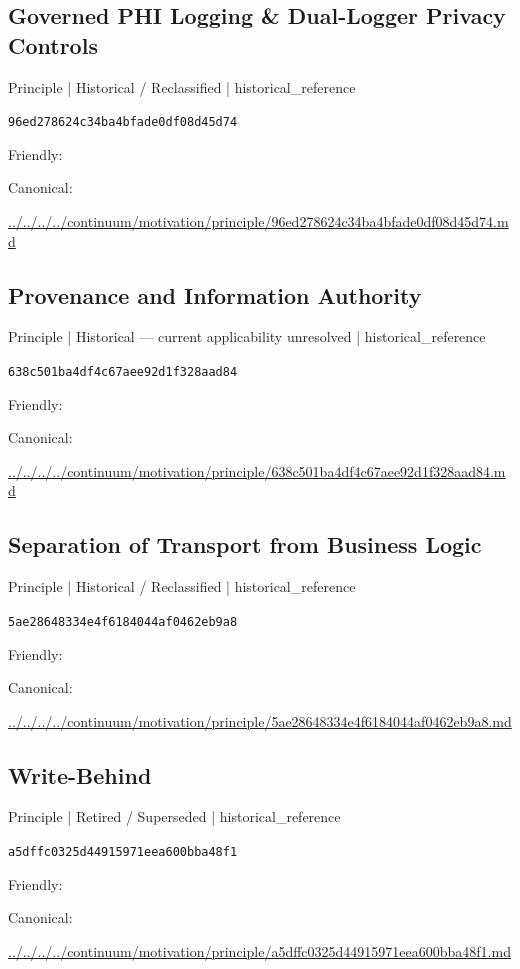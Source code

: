 \documentclass[10pt,a4paper]{article}
\begin{document}
\subsection*{Governed PHI Logging \& Dual-Logger Privacy Controls}
{\small Principle | Historical / Reclassified | historical\_reference}\par
\texttt{96ed278624c34ba4bfade0df08d45d74}\par
Friendly: \par
Canonical: \par
{\footnotesize\url{../../../../continuum/motivation/principle/96ed278624c34ba4bfade0df08d45d74.md}}\par
\subsection*{Provenance and Information Authority}
{\small Principle | Historical — current applicability unresolved | historical\_reference}\par
\texttt{638c501ba4df4c67aee92d1f328aad84}\par
Friendly: \par
Canonical: \par
{\footnotesize\url{../../../../continuum/motivation/principle/638c501ba4df4c67aee92d1f328aad84.md}}\par
\subsection*{Separation of Transport from Business Logic}
{\small Principle | Historical / Reclassified | historical\_reference}\par
\texttt{5ae28648334e4f6184044af0462eb9a8}\par
Friendly: \par
Canonical: \par
{\footnotesize\url{../../../../continuum/motivation/principle/5ae28648334e4f6184044af0462eb9a8.md}}\par
\subsection*{Write-Behind}
{\small Principle | Retired / Superseded | historical\_reference}\par
\texttt{a5dffc0325d44915971eea600bba48f1}\par
Friendly: \par
Canonical: \par
{\footnotesize\url{../../../../continuum/motivation/principle/a5dffc0325d44915971eea600bba48f1.md}}\par
\end{document}
